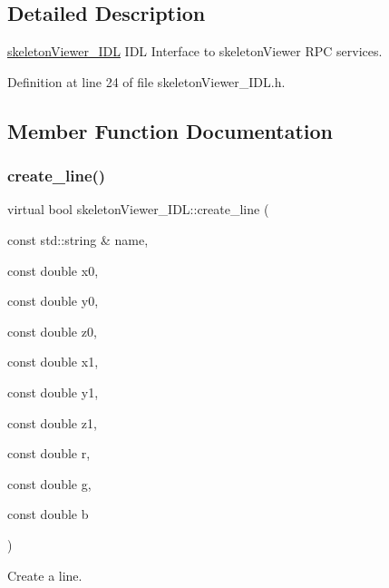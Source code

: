 \subsection{Detailed Description}
\mbox{\hyperlink{classskeletonViewer__IDL}{skeleton\+Viewer\+\_\+\+I\+DL}} I\+DL Interface to skeleton\+Viewer R\+PC services. 

Definition at line 24 of file skeleton\+Viewer\+\_\+\+I\+D\+L.\+h.



\subsection{Member Function Documentation}
\mbox{\label{classskeletonViewer__IDL_ae893be656a21bfd75682fd4efb20a2d8}} 
\subsubsection{\texorpdfstring{create\_line()}{create\_line()}}
{\footnotesize\ttfamily virtual bool skeleton\+Viewer\+\_\+\+I\+D\+L\+::create\+\_\+line (\begin{DoxyParamCaption}\item[{const std\+::string \&}]{name,  }\item[{const double}]{x0,  }\item[{const double}]{y0,  }\item[{const double}]{z0,  }\item[{const double}]{x1,  }\item[{const double}]{y1,  }\item[{const double}]{z1,  }\item[{const double}]{r,  }\item[{const double}]{g,  }\item[{const double}]{b }\end{DoxyParamCaption})\hspace{0.3cm}{\ttfamily [virtual]}}



Create a line. 



